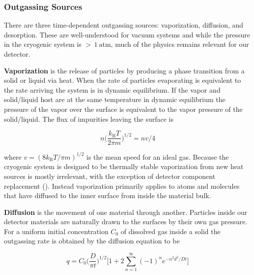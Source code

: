 \subsubsection{Outgassing Sources}
\label{subsubsec:electron_lifetime_model_outgassing_sources}
There are three time-dependent outgassing sources: vaporization, diffusion, and desorption.  These are well-understood for vacuum systems
and while the pressure in the cryogenic system is ${>}\, 1\ \mathrm{atm}$, much of the physics remains relevant for our detector.

\textbf{Vaporization} is the release of particles by producing a phase transition from a solid or liquid via heat.  When the rate of
particles evaporating is equivalent to the rate arriving the system is in dynamic equilibrium.  If the vapor and solid/liquid host are at
the same temperature in dynamic equilibrium the pressure of the vapor over the surface is equivalent to the vapor pressure of the
solid/liquid.  The flux of impurities leaving the surface is

\vspace{-10pt}

\begin{equation}
n \bigg( \frac{k_{\mathrm{B}}T}{2 \pi m} \bigg)^{1/2} = nv/4
\end{equation}

\noindent where $v = (8k_{\mathrm{B}}T/\pi m)^{1/2}$ is the mean speed for an ideal gas.  Because the cryogenic system is designed to be
thermally stable vaporization from new heat sources is mostly irrelevant, with the exception of detector component replacement
().  Instead vaporization primarily applies to atoms and molecules that have diffused to the
inner surface from inside the material bulk.

\textbf{Diffusion} is the movement of one material through another.  Particles inside our detector materials are naturally drawn to the
surfaces by their own gas pressure.  For a uniform initial concentration $C_0$ of dissolved gas inside a solid the outgassing rate is
obtained by the diffusion equation to be

\vspace{-5pt}

\begin{equation}
q = C_0 \bigg( \frac{D}{\pi t} \bigg)^{1/2} \Bigg[ 1 + 2 \sum_{n = 1}^{\infty} (-1)^n e^{-n^2 d^2 / Dt} \Bigg]
\label{eq:electron_lifetime_model_outgassing_sources_diffusion}
\end{equation}

